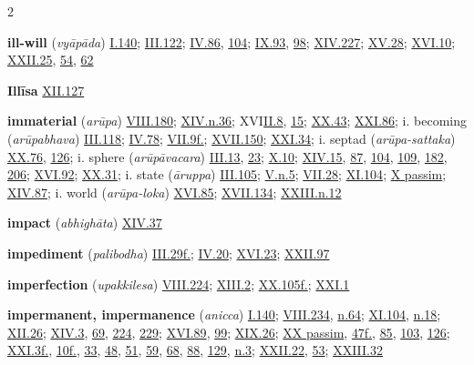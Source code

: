 \begin{multicols}{2}
\begin{vismHanging}
\par\textbf{ill-will} (\emph{vyāpāda}) \hyperlink{I.140}{I.140}{}; \hyperlink{III.122}{III.122}{}; \hyperlink{IV.86}{IV.86}{}, \hyperlink{IV.104}{104}{}; \hyperlink{IX.93}{IX.93}{}, \hyperlink{IX.98}{98}{}; \hyperlink{XIV.227}{XIV.227}{}; \hyperlink{XV.28}{XV.28}{}; \hyperlink{XVI.10}{XVI.10}{}; \hyperlink{XXII.25}{XXII.25}{}, \hyperlink{XXII.54}{54}{}, \hyperlink{XXII.62}{62}{}
\par\textbf{Illīsa} \hyperlink{XII.127}{XII.127}{}
\par\textbf{immaterial} (\emph{arūpa}) \hyperlink{VIII.180}{VIII.180}{}; \hyperlink{XIV.n36}{XIV.n.36}{}; XVI\hyperlink{II.8}{II.8}{}, \hyperlink{II.15}{15}{}; \hyperlink{XX.43}{XX.43}{}; \hyperlink{XXI.86}{XXI.86}{}; i. becoming (\emph{arūpabhava}) \hyperlink{III.118}{III.118}{}; \hyperlink{IV.78}{IV.78}{}; \hyperlink{VII.9}{VII.9f.}{}; \hyperlink{XVII.150}{XVII.150}{}; \hyperlink{XXI.34}{XXI.34}{}; i. septad (\emph{arūpa-sattaka}) \hyperlink{XX.76}{XX.76}{}, \hyperlink{XX.126}{126}{}; i. sphere (\emph{arūpāvacara}) \hyperlink{III.13}{III.13}{}, \hyperlink{III.23}{23}{}; \hyperlink{X.10}{X.10}{}; \hyperlink{XIV.15}{XIV.15}{}, \hyperlink{XIV.87}{87}{}, \hyperlink{XIV.104}{104}{}, \hyperlink{XIV.109}{109}{}, \hyperlink{XIV.182}{182}{}, \hyperlink{XIV.206}{206}{}; \hyperlink{XVI.92}{XVI.92}{}; \hyperlink{XX.31}{XX.31}{}; i. state (\emph{āruppa}) \hyperlink{III.105}{III.105}{}; \hyperlink{V.n5}{V.n.5}{}; \hyperlink{VII.28}{VII.28}{}; \hyperlink{XI.104}{XI.104}{}; \hyperlink{X}{X passim}{}; \hyperlink{XIV.87}{XIV.87}{}; i. world (\emph{arūpa-loka}) \hyperlink{XVI.85}{XVI.85}{}; \hyperlink{XVII.134}{XVII.134}{}; \hyperlink{XXIII.n12}{XXIII.n.12}{}
\par\textbf{impact} (\emph{abhighāta}) \hyperlink{XIV.37}{XIV.37}{}
\par\textbf{impediment} (\emph{palibodha}) \hyperlink{III.29}{III.29f.}{}; \hyperlink{IV.20}{IV.20}{}; \hyperlink{XVI.23}{XVI.23}{}; \hyperlink{XXII.97}{XXII.97}{}
\par\textbf{imperfection} (\emph{upakkilesa}) \hyperlink{VIII.224}{VIII.224}{}; \hyperlink{XIII.2}{XIII.2}{}; \hyperlink{XX.105}{XX.105f.}{}; \hyperlink{XXI.1}{XXI.1}{}
\par\textbf{impermanent, impermanence} (\emph{anicca}) \hyperlink{I.140}{I.140}{}; \hyperlink{VIII.234}{VIII.234}{}, \hyperlink{VIII.n64}{n.64}{}; \hyperlink{XI.104}{XI.104}{}, \hyperlink{XI.n18}{n.18}{}; \hyperlink{XII.26}{XII.26}{}; \hyperlink{XIV.3}{XIV.3}{}, \hyperlink{XIV.69}{69}{}, \hyperlink{XIV.224}{224}{}, \hyperlink{XIV.229}{229}{}; \hyperlink{XVI.89}{XVI.89}{}, \hyperlink{XVI.99}{99}{}; \hyperlink{XIX.26}{XIX.26}{}; \hyperlink{XX}{XX passim}{}, \hyperlink{XX.47}{47f.}{}, \hyperlink{XX.85}{85}{}, \hyperlink{XX.103}{103}{}, \hyperlink{XX.126}{126}{}; \hyperlink{XXI.3}{XXI.3f.}{}, \hyperlink{XXI.10}{10f.}{}, \hyperlink{XXI.33}{33}{}, \hyperlink{XXI.48}{48}{}, \hyperlink{XXI.51}{51}{}, \hyperlink{XXI.59}{59}{}, \hyperlink{XXI.68}{68}{}, \hyperlink{XXI.88}{88}{}, \hyperlink{XXI.129}{129}{}, \hyperlink{XXI.n3}{n.3}{}; \hyperlink{XXII.22}{XXII.22}{}, \hyperlink{XXII.53}{53}{}; \hyperlink{XXIII.32}{XXIII.32}{}

\end{vismHanging}
\end{multicols}
